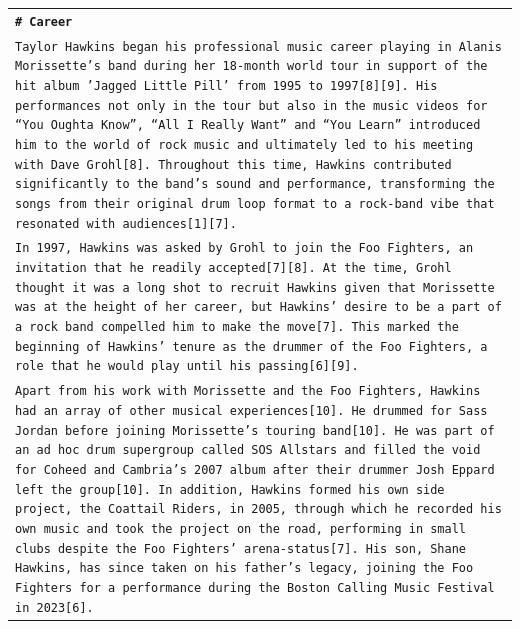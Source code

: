 \documentclass[11pt]{article}
\begin{document}
\begin{longtable}{p{\textwidth}}
\vspace{1pt}
\texttt{\small{\textbf{\# Career}}} \\
\texttt{\small{Taylor Hawkins began his professional music career playing in Alanis Morissette’s band during her 18-month world tour in support of the hit album 'Jagged Little Pill' from 1995 to 1997[8][9]. His performances not only in the tour but also in the music videos for “You Oughta Know”, “All I Really Want” and “You Learn” introduced him to the world of rock music and ultimately led to his meeting with Dave Grohl[8]. Throughout this time, Hawkins contributed significantly to the band's sound and performance, transforming the songs from their original drum loop format to a rock-band vibe that resonated with audiences[1][7].}} \\
\texttt{\small{In 1997, Hawkins was asked by Grohl to join the Foo Fighters, an invitation that he readily accepted[7][8]. At the time, Grohl thought it was a long shot to recruit Hawkins given that Morissette was at the height of her career, but Hawkins' desire to be a part of a rock band compelled him to make the move[7]. This marked the beginning of Hawkins' tenure as the drummer of the Foo Fighters, a role that he would play until his passing[6][9].}} \\
\texttt{\small{Apart from his work with Morissette and the Foo Fighters, Hawkins had an array of other musical experiences[10]. He drummed for Sass Jordan before joining Morissette’s touring band[10]. He was part of an ad hoc drum supergroup called SOS Allstars and filled the void for Coheed and Cambria’s 2007 album after their drummer Josh Eppard left the group[10]. In addition, Hawkins formed his own side project, the Coattail Riders, in 2005, through which he recorded his own music and took the project on the road, performing in small clubs despite the Foo Fighters' arena-status[7]. His son, Shane Hawkins, has since taken on his father's legacy, joining the Foo Fighters for a performance during the Boston Calling Music Festival in 2023[6].}}\\


\end{longtable}
\end{document}
